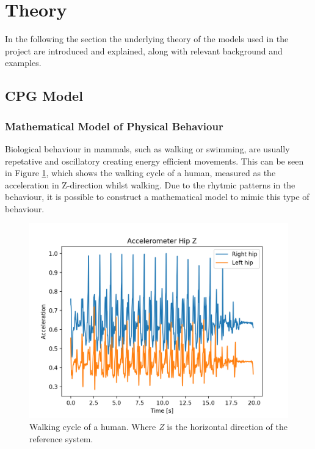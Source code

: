 \section{Theory}
In the following the section the underlying theory of the models used in the project are introduced and explained, along with relevant background and examples. 

\subsection{CPG Model}

\subsubsection{Mathematical Model of Physical Behaviour}

Biological behaviour in mammals, such as walking or swimming, are usually repetative and oscillatory creating energy efficient movements. This can be seen in Figure \ref{fig:walkingCycle}, which shows the walking cycle of a human, measured as the acceleration in Z-direction whilst walking. Due to the rhytmic patterns in the behaviour, it is possible to construct a mathematical model to mimic this type of behaviour. 

\begin{figure}[htbp]
    \centering
    \includegraphics[width=.75\textwidth]{include/figure/reference_right_hip_z.png}
    \caption{Walking cycle of a human. Where \textit{Z} is the horizontal direction of the reference system.}
    \label{fig:walkingCycle}
\end{figure}


